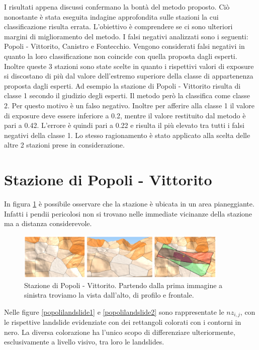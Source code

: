 I risultati appena discussi confermano la bontà del metodo proposto. Ciò nonostante è stata eseguita indagine approfondita sulle stazioni la cui classificazione risulta errata. L'obiettivo è comprendere se ci sono ulteriori margini di miglioramento del metodo.
I falsi negativi analizzati sono i seguenti: Popoli - Vittorito, Canistro e Fontecchio. Vengono considerati falsi negativi in quanto la loro classificazione non coincide con quella proposta dagli esperti. Inoltre queste 3 stazioni sono state scelte in quanto i rispettivi valori di exposure  si discostano di più dal valore dell'estremo superiore della classe di appartenenza proposta dagli esperti. Ad esempio la stazione di Popoli - Vittorito risulta di classe 1 secondo il giudizio degli esperti. Il metodo però la classifica come classe 2. Per questo motivo è un falso negativo. Inoltre per afferire alla classe 1 il valore di exposure deve essere inferiore a 0.2, mentre il valore restituito dal metodo è pari a 0.42. L'errore è quindi pari a 0.22 e risulta il più elevato tra tutti i falsi negativi della classe 1. Lo stesso ragionamento è stato applicato alla scelta delle altre 2 stazioni prese in considerazione. 

\section{Stazione di Popoli - Vittorito}
In figura \ref{Popoli_Final} è possibile osservare che la stazione è ubicata in un area pianeggiante. Infatti i pendii pericolosi non si trovano nelle immediate vicinanze della stazione ma a distanza considerevole. 

	\begin{figure}[h]
	\centering
	\includegraphics[width=0.9\textwidth]{images/PopoliFinal}
	\caption{Stazione di Popoli - Vittorito. Partendo dalla prima immagine a sinistra  troviamo la vista dall'alto, di profilo e frontale.}
	\label{Popoli_Final}
\end{figure}

Nelle figure \ref{popolilandslide1} e \ref{popolilandslide2} sono rappresentate le $nz_{i,j}$, con le rispettive landslide evidenziate con dei rettangoli colorati con i contorni in nero. La diversa colorazione ha l'unico scopo di differenziare ulteriormente, esclusivamente a livello visivo, tra loro le landslides.


